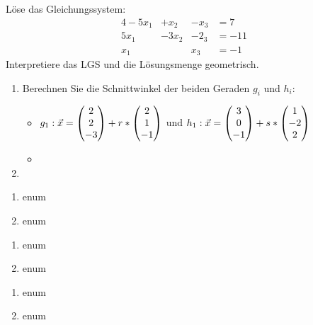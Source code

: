 




Löse das Gleichungssystem:
\begin{alignat*}{4}
	-5x_1& +x_2& -x_3& = 7\\
	5x_1&  -3x_2& -2_3& = -11\\
	x_1& & x_3& =-1
\end{alignat*}
Interpretiere das LGS und die Lösungsmenge geometrisch.



\begin{enumerate}
	\item Berechnen Sie die Schnittwinkel der beiden Geraden $g_i$ und $h_i$:
	\begin{itemize}
		\item $g_1: \vec x = \begin{pmatrix} 2\\2\\-3 \end{pmatrix} + r*\begin{pmatrix} 2\\1\\-1 \end{pmatrix}$ und $h_1: \vec x = \begin{pmatrix} 3\\0\\-1 \end{pmatrix} + s* \begin{pmatrix} 1\\-2\\2 \end{pmatrix}$
		\item
	\end{itemize}
	\item
\end{enumerate}

\begin{enumerate}
	\item enum
	\item	enum
\end{enumerate}

\begin{enumerate}
	\item enum
	\item	enum
\end{enumerate}


\begin{enumerate}
	\item enum
	\item	enum
\end{enumerate}



